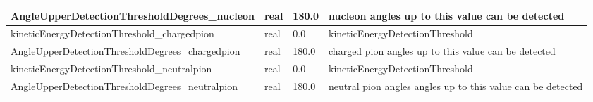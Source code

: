 \documentclass{article}
\begin{document}
\begin{longtable}{llll}
\midrule
AngleUpperDetectionThresholdDegrees\_nucleon & \begin{minipage}[t]{2cm}real\end{minipage} & \begin{minipage}[t]{2cm}180.0\end{minipage} & \begin{minipage}[t]{12cm}nucleon angles up to this value can be detected\end{minipage}\\*
\midrule
kineticEnergyDetectionThreshold\_chargedpion & \begin{minipage}[t]{2cm}real\end{minipage} & \begin{minipage}[t]{2cm}0.0\end{minipage} & \begin{minipage}[t]{12cm}kineticEnergyDetectionThreshold\end{minipage}\\*
\midrule
AngleUpperDetectionThresholdDegrees\_chargedpion & \begin{minipage}[t]{2cm}real\end{minipage} & \begin{minipage}[t]{2cm}180.0\end{minipage} & \begin{minipage}[t]{12cm}charged pion angles up to this value can be detected\end{minipage}\\*
\midrule
kineticEnergyDetectionThreshold\_neutralpion & \begin{minipage}[t]{2cm}real\end{minipage} & \begin{minipage}[t]{2cm}0.0\end{minipage} & \begin{minipage}[t]{12cm}kineticEnergyDetectionThreshold\end{minipage}\\*
\midrule
AngleUpperDetectionThresholdDegrees\_neutralpion & \begin{minipage}[t]{2cm}real\end{minipage} & \begin{minipage}[t]{2cm}180.0\end{minipage} & \begin{minipage}[t]{12cm}neutral pion angles angles up to this value can be detected\end{minipage}\\*
\midrule

\end{longtable}
\end{document}
